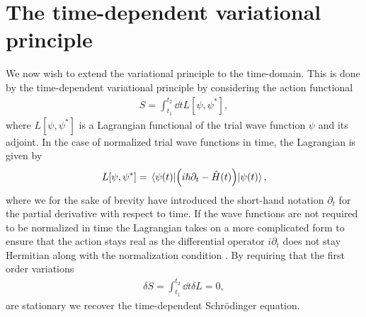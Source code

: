     \section{The time-dependent variational principle}
        \label{sec:tdvp}
        We now wish to extend the variational principle to the time-domain.
        This is done by the time-dependent variational principle by considering
        the action functional
        \begin{align}
            S = \int_{t_1}^{t_2}\dd t L[\psi, \psi^{*}],
        \end{align}
        where $L[\psi, \psi^{*}]$ is a Lagrangian functional of the trial wave
        function $\psi$ and its adjoint.
        In the case of normalized trial wave functions in time, the Lagrangian
        is given by
        \begin{align}
            L[\psi, \psi^{*}]
            =
            \mel*{\psi(t)}{
                \left( 
                    i\hslash\partial_t - \hat{H}(t)
                 \right)
            }{\psi(t)},
        \end{align}
        where we for the sake of brevity have introduced the short-hand notation
        $\partial_t$ for the partial derivative with respect to time.
        If the wave functions are not required to be normalized in time the
        Lagrangian takes on a more complicated form to ensure that the action
        stays real as the differential operator $i\partial_t$ does not stay
        Hermitian along with the normalization condition
        \cite{kramer1981geometry}.
        By requiring that the first order variations
        \begin{align}
            \delta S
            = \int_{t_1}^{t_2}\dd t \delta L
            = 0,
            \label{eq:stationary-action}
        \end{align}
        are stationary we recover the time-dependent Schrödinger equation.
